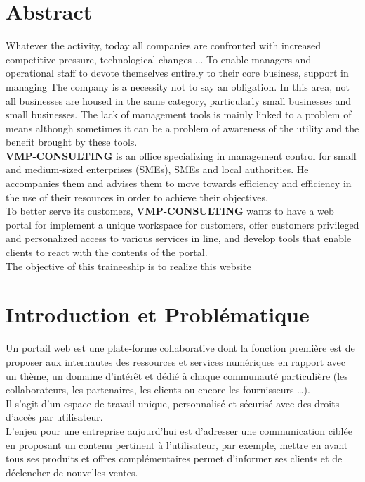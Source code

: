 \documentclass[12pt]{article}
\begin{document}
\section*{Abstract}
Whatever the activity, today all companies are confronted with increased competitive pressure, technological changes ... To enable managers and operational staff to devote themselves entirely to their core business, support in managing The company is a necessity not to say an obligation. In this area, not all businesses are housed in the same category, particularly small businesses and small businesses. The lack of management tools is mainly linked to a problem of means although sometimes it can be a problem of awareness of the utility and the benefit brought by these tools.\\
\textbf{VMP-CONSULTING}  is an office specializing in management control for small and medium-sized enterprises (SMEs), SMEs and local authorities. He accompanies them and advises them to move towards efficiency and efficiency in the use of their resources in order to achieve their objectives.\\
To better serve its customers, \textbf{VMP-CONSULTING}  wants to have a web portal for
implement a unique workspace for customers,
 offer customers privileged and personalized access to various services in
line, and
develop tools that enable clients to react with the contents of the
portal.\\
The objective of this traineeship is to realize this website

\newpage

\tableofcontents
\newpage



\section{Introduction et Problématique}

Un portail web est une plate-forme collaborative dont la fonction première est de proposer aux internautes des ressources et services numériques en rapport avec un thème, un domaine d’intérêt et dédié à chaque communauté particulière (les collaborateurs, les partenaires, les clients ou encore les fournisseurs …).\\
Il s’agit d’un espace de travail unique, personnalisé et sécurisé avec des droits d’accès par utilisateur.\\
L’enjeu pour une entreprise aujourd'hui est d’adresser une communication ciblée en proposant un contenu pertinent à l’utilisateur, par exemple, mettre en avant tous ses produits et offres complémentaires permet d’informer ses clients et de déclencher de nouvelles ventes.\\ \\
\end{document}
